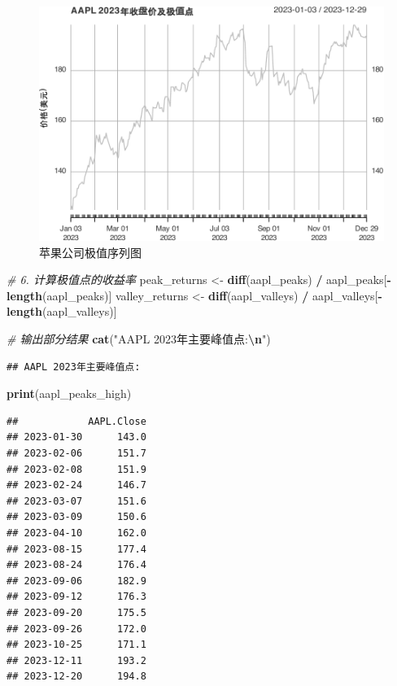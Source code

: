 \documentclass[]{ctexbook}
\newenvironment{Shaded}{\begin{snugshade}}{\end{snugshade}}
\newcommand{\CommentTok}[1]{\textcolor[rgb]{0.56,0.35,0.01}{\textit{#1}}}
\newcommand{\FunctionTok}[1]{\textcolor[rgb]{0.13,0.29,0.53}{\textbf{#1}}}
\newcommand{\NormalTok}[1]{#1}
\newcommand{\OtherTok}[1]{\textcolor[rgb]{0.56,0.35,0.01}{#1}}
\newcommand{\SpecialCharTok}[1]{\textcolor[rgb]{0.81,0.36,0.00}{\textbf{#1}}}
\newcommand{\StringTok}[1]{\textcolor[rgb]{0.31,0.60,0.02}{#1}}
\begin{document}
\begin{figure}
\includegraphics[width=0.9\linewidth]{QuantmodHandbook_files/figure-latex/peak-1} \caption{苹果公司极值序列图}\label{fig:peak}
\end{figure}

\begin{Shaded}
\begin{Highlighting}[]
\CommentTok{\# 6. 计算极值点的收益率}
\NormalTok{peak\_returns }\OtherTok{\textless{}{-}} \FunctionTok{diff}\NormalTok{(aapl\_peaks) }\SpecialCharTok{/}\NormalTok{ aapl\_peaks[}\SpecialCharTok{{-}}\FunctionTok{length}\NormalTok{(aapl\_peaks)]}
\NormalTok{valley\_returns }\OtherTok{\textless{}{-}} \FunctionTok{diff}\NormalTok{(aapl\_valleys) }\SpecialCharTok{/}\NormalTok{ aapl\_valleys[}\SpecialCharTok{{-}}\FunctionTok{length}\NormalTok{(aapl\_valleys)]}

\CommentTok{\# 输出部分结果}
\FunctionTok{cat}\NormalTok{(}\StringTok{"AAPL 2023年主要峰值点:}\SpecialCharTok{\textbackslash{}n}\StringTok{"}\NormalTok{)}
\end{Highlighting}
\end{Shaded}

\begin{verbatim}
## AAPL 2023年主要峰值点:
\end{verbatim}

\begin{Shaded}
\begin{Highlighting}[]
\FunctionTok{print}\NormalTok{(aapl\_peaks\_high)}
\end{Highlighting}
\end{Shaded}

\begin{verbatim}
##            AAPL.Close
## 2023-01-30      143.0
## 2023-02-06      151.7
## 2023-02-08      151.9
## 2023-02-24      146.7
## 2023-03-07      151.6
## 2023-03-09      150.6
## 2023-04-10      162.0
## 2023-08-15      177.4
## 2023-08-24      176.4
## 2023-09-06      182.9
## 2023-09-12      176.3
## 2023-09-20      175.5
## 2023-09-26      172.0
## 2023-10-25      171.1
## 2023-12-11      193.2
## 2023-12-20      194.8
\end{verbatim}
\end{document}
